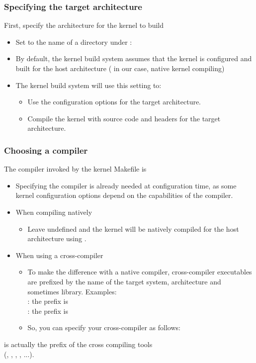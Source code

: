 \begin{frame}
  \frametitle{Specifying the target architecture}
  First, specify the architecture for the kernel to build
  \begin{itemize}
  \item Set  to the name of a directory under :\\
  \item By default, the kernel build system assumes that the
        kernel is configured and built for the host architecture
	( in our case, native kernel compiling)
  \item The kernel build system will use this setting to:
	\begin{itemize}
	\item Use the configuration options for the target
	      architecture.
	\item Compile the kernel with source code and headers
	      for the target architecture.
	\end{itemize}
  \end{itemize}
\end{frame}

\begin{frame}[fragile]
  \frametitle{Choosing a compiler}
  The compiler invoked by the kernel Makefile is 
  \begin{itemize}
    \item Specifying the compiler is already needed at configuration
	  time, as some kernel configuration options depend on the
          capabilities of the compiler.
    \item When compiling natively
      \begin{itemize}
	 \item Leave  undefined and the kernel
	    will be natively compiled for the host architecture
            using .
      \end{itemize}
    \item When using a cross-compiler
      \begin{itemize}
      \item To make the difference with a native compiler, cross-compiler
          executables are prefixed by the name of the target system,
          architecture and sometimes library. Examples:\\
          \small
          : the prefix is \\
          : the prefix is 
      \item So, you can specify your cross-compiler as follows:\\
      \end{itemize}
  \end{itemize}
   is actually the prefix of the cross compiling tools\\
       (, , , , ...).
\end{frame}


